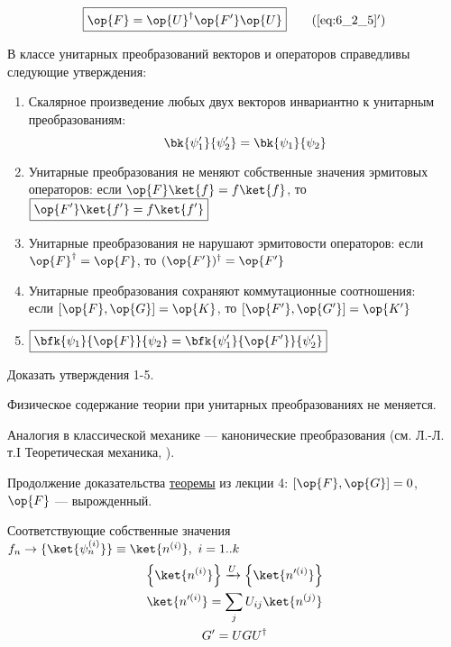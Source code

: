 \begin{equation}
\label{eq:6_2_5_add}
\boxed{\op{F}=\op{U}^\dag \op{F'} \op{U}}
\tag{\ref{eq:6_2_5}$'$}
\end{equation}

В классе унитарных преобразований векторов и операторов справедливы следующие утверждения:
\begin{enumerate}
\item Скалярное произведение любых двух векторов инвариантно к унитарным преобразованиям:
$$
\bk{\psi'_1}{\psi'_2}=\bk{\psi_1}{\psi_2}
$$
\item Унитарные преобразования не меняют собственные значения эрмитовых операторов: если $\op{F}\ket{f}=f\ket{f}$, то $\boxed{\op{F'}\ket{f'}=f\ket{f'}}$

\item Унитарные преобразования не нарушают эрмитовости операторов: если $\op{F}^\dag=\op{F}$, то $(\op{F'})^\dag=\op{F'}$

\item Унитарные преобразования сохраняют коммутационные соотношения: \\
если $[\op{F}, \op{G}]=\op{K}$, то $[\op{F'}, \op{G'}]=\op{K'}$

\item $\boxed{\bfk{\psi_1}{\op{F}}{\psi_2}=\bfk{\psi'_1}{\op{F'}}{\psi'_2}}$
\end{enumerate}

\begin{excr}
Доказать утверждения 1-5.
\end{excr}

Физическое содержание теории при унитарных преобразованиях не меняется.


Аналогия в классической механике --- канонические преобразования (см. Л.-Л. т.I Теоретическая механика, ).

Продолжение доказательства \hyperref[theorema_iv_chapter]{теоремы} из лекции 4:
$[\op{F},\op{G}]=0$, $\op{F}$ --- вырожденный.

Соответствующие собственные значения $f_n \rightarrow \{\ket{\psi_n^{(i)}}\} \equiv \ket{n^{(i)}},~i = 1..k$
$$
\begin{gathered}
\left\{\ket{n^{(i)}}\right\} \xrightarrow{U} \left\{\ket{n'^{(i)}}\right\} \\
\ket{n'^{(i)}}=\sum_j U_{ij} \ket{n^{(j)}} \\
G'=U G U^\dag
\end{gathered}
$$

